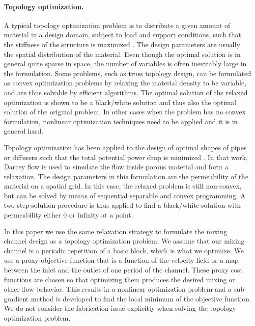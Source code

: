 \documentclass[times]{fldauth}
\begin{document}
\paragraph{Topology optimization.}
A typical topology optimization problem is to distribute a given
amount of material in a design domain, subject to load and support
conditions, such that the stiffness of the structure is maximized
\cite{Bendsoe2003}. The design parameters are usually the spatial
distribution of the material. Even though the optimal solution is in
general quite sparse in space, the number of variables is often
inevitably large in the formulation. Some problems, such as truss
topology design, can be formulated as convex optimization problems
\cite{BenTal1997} by relaxing the material density to be variable, and
are thus solvable by efficient algorithms. The optimal solution of the
relaxed optimization is shown to be a black/white solution and thus
also the optimal solution of the original problem. In other cases when
the problem has no convex formulation, nonlinear optimization
techniques need to be applied and it is in general hard.

Topology optimization has been applied to the design of optimal shapes
of pipes or diffusers such that the total potential power drop is
minimized \cite{Evgrafov2005, Borrvall2003}. In that work, Darcey flow
is used to simulate the flow inside porous material and form a
relaxation. The design parameters in this formulation are the
permeability of the material on a spatial grid. In this case, the
relaxed problem is still non-convex, but can be solved by means of
sequential separable and convex programming. A two-step solution
procedure is thus applied to find a black/white solution with
permeability either $0$ or infinity at a point.

In this paper we use the same relaxation strategy \cite{Evgrafov2005,
  Borrvall2003} to formulate the mixing channel design as a topology
optimization problem. We assume that our mixing channel is a periodic
repetition of a basic block, which is what we optimize. We use a proxy
objective function that is a function of the velocity field or a map
between the inlet and the outlet of one period of the channel. These
proxy cost functions are chosen so that optimizing them produces the
desired mixing or other flow behavior. This results in a nonlinear
optimization problem and a sub-gradient method is developed to find
the local minimum of the objective function. We do not consider the
fabrication issue explicitly when solving the topology optimization
problem.
\end{document}
